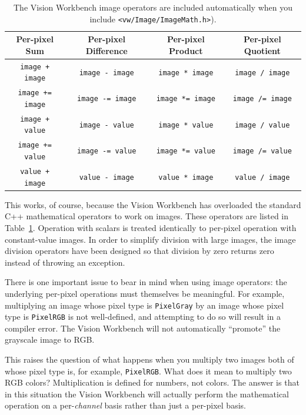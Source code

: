 \begin{table}[t]\begin{centering}
\begin{tabular}{|c|c|c|c|} \hline
Per-pixel Sum & Per-pixel Difference & Per-pixel Product & Per-pixel Quotient \\ \hline \hline
\verb#image + image#  & \verb#image - image#  & \verb#image * image#  & \verb#image / image#  \\ \hline
\verb#image += image# & \verb#image -= image# & \verb#image *= image# & \verb#image /= image# \\ \hline
\verb#image + value#  & \verb#image - value#  & \verb#image * value#  & \verb#image / value#  \\ \hline
\verb#image += value# & \verb#image -= value# & \verb#image *= value# & \verb#image /= value# \\ \hline
\verb#value + image#  & \verb#value - image#  & \verb#value * image#  & \verb#value / image#  \\ \hline
\end{tabular}
\caption{The Vision Workbench image operators are included
  automatically when you include {\tt <vw/Image/ImageMath.h>}).}
\label{tbl:image-operators}
\end{centering}\end{table}

This works, of course, because the Vision Workbench has overloaded the
standard C++ mathematical operators to work on images.  These
operators are listed in Table~\ref{tbl:image-operators}.  Operation
with scalars is treated identically to per-pixel operation with
constant-value images.  In order to simplify division with large
images, the image division operators have been designed so that
division by zero returns zero instead of throwing an exception.

There is one important issue to bear in mind when using image
operators: the underlying per-pixel operations must themselves be
meaningful.  For example, multiplying an image whose pixel type is
\verb#PixelGray# by an image whose pixel type is \verb#PixelRGB# is
not well-defined, and attempting to do so will result in a compiler
error.  The Vision Workbench will not automatically ``promote'' the
grayscale image to RGB.

This raises the question of what happens when you multiply two images
both of whose pixel type is, for example, \verb#PixelRGB#.  What does
it mean to multiply two RGB colors?  Multiplication is defined for
numbers, not colors.  The answer is that in this situation the Vision
Workbench will actually perform the mathematical operation on a
per-{\it channel} basis rather than just a per-pixel basis.

